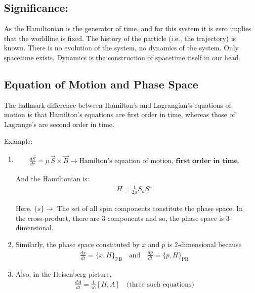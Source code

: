 \documentclass[14pt]{article} %
\begin{document}
\subsection*{Significance:}
As the Hamiltonian is the generator of time, and for this system it is zero implies that the worldline is fixed. The history of the particle (i.e., the trajectory) is known. There is no evolution of the system, no dynamics of the system. Only spacetime exists. Dynamics is the construction of spacetime itself in our head.

\subsection*{Equation of Motion and Phase Space}
The hallmark difference between Hamilton's and Lagrangian's equations of motion is that Hamilton's equations are first order in time, whereas those of Lagrange's are second order in time.

Example:

\begin{enumerate}
    \item 
\begin{align*}
    \frac{d\vec{S}}{d\tau} = \mu \, \vec{S} \times \vec{B}
    \longrightarrow \text{Hamilton's equation of motion,} \textbf{ first order in time.}
\end{align*}
    
    And the Hamiltonian is:
\begin{align*}
    H = \frac{1}{2\mu} S_a S^a
\end{align*}
    
    Here, $\{s\} \rightarrow$ The set of all spin components constitute the phase space. In the cross-product, there are 3 components and so, the phase space is 3-dimensional.

    \item 
    Similarly, the phase space constituted by $x$ and $p$ is 2-dimensional because
\begin{align*}
    \frac{dx}{dt} = \{x, H\}_{\text{PB}} \quad \text{and} \quad \frac{dp}{dt} = \{p, H\}_{\text{PB}}
\end{align*}

    \item 
    Also, in the Heisenberg picture,
\begin{align*}
    \frac{dA}{dt} = \frac{1}{i\hbar} [H, A] \quad \text{(three such equations)}
\end{align*}
\end{enumerate}
\end{document}
